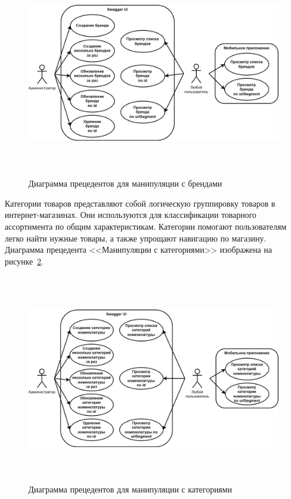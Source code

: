 \begin{figure}[!htb]
    \centering

    \includegraphics[height=9.2cm]
    {images/UML/UML_precedent_item_brands.png}

    \caption{Диаграмма прецедентов для манипуляции с брендами}

    \label{fig:UML_precedent_item_brands}
\end{figure}
Категории товаров представляют собой логическую группировку товаров в интернет-магазинах.
Они используются для классификации товарного ассортимента по общим характеристикам.
Категории помогают пользователям легко найти нужные товары, а также упрощают навигацию по магазину.
Диаграмма прецедента <<Манипуляции с категориями>> изображена на рисунке~\ref{fig:UML_precedent_item_categories}.

\begin{figure}[!htb]
    \centering

    \includegraphics[height=9.2cm]
    {images/UML/UML_precedent_item_categories.png}

    \caption{Диаграмма прецедентов для манипуляции с категориями}

    \label{fig:UML_precedent_item_categories}
\end{figure}

